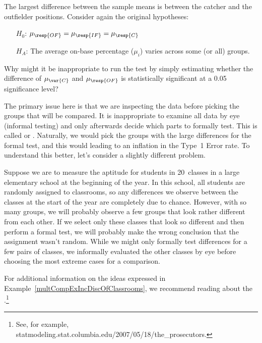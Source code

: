 \begin{examplewrap}
\begin{nexample}{The largest difference between the sample means
    is between the catcher and the outfielder positions.
    Consider again the original hypotheses:
    \begin{itemize}
    \setlength{\itemsep}{0mm}
    \item[$H_0$:]
        $\mu_{\resp{OF}} = \mu_{\resp{IF}} = \mu_{\resp{C}}$
    \item[$H_A$:]
        The average on-base percentage ($\mu_i$) varies
        across some (or all) groups.
    \end{itemize}
    Why might it be inappropriate to run the test by simply
    estimating whether the difference of $\mu_{\var{C}}$ and
    $\mu_{\resp{OF}}$ is statistically significant at a 0.05
    significance level?}
  \label{multCompExIncDiscOfClassrooms}%
  The primary issue here is that we are inspecting the data
  before picking the groups that will be compared.
  It is inappropriate to examine all data by eye
  (informal testing) and only afterwards decide which parts
  to formally test.
  This is called  or .
  Naturally, we would pick the groups with the large
  differences for the formal test, and this would leading
  to an inflation in the Type~1 Error rate.
  To understand this better, let's consider a slightly
  different problem.

  Suppose we are to measure the aptitude for students in
  20~classes in a large elementary school at the beginning
  of the year.
  In this school, all students are randomly assigned to
  classrooms, so any differences we observe between the
  classes at the start of the year are completely due
  to chance.
  However, with so many groups, we will probably observe
  a few groups that look rather different from each other.
  If we select only these classes that look so different
  and then perform a formal test,
  we will probably make the wrong conclusion that the
  assignment wasn't random.
  While we might only formally test differences
  for a few pairs of classes, we informally evaluated
  the other classes by eye before choosing the most extreme
  cases for a comparison.
\end{nexample}
\end{examplewrap}

For additional information on the ideas expressed in
Example~\ref{multCompExIncDiscOfClassrooms}, we recommend
reading about the
.\footnote{See, for example,
      {statmodeling.stat.columbia.edu/2007/05/18/the\_prosecutors}.}

